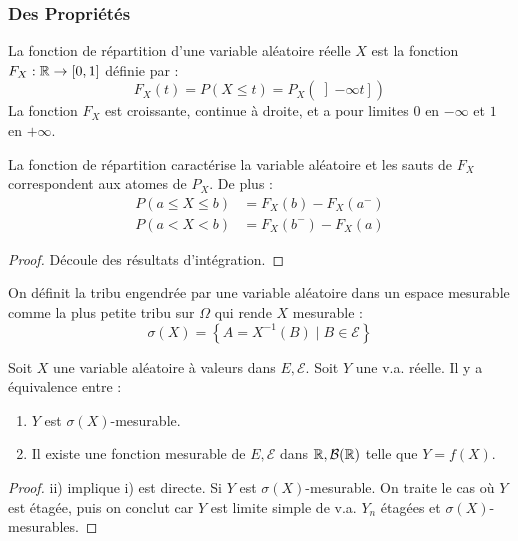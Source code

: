 \documentclass{cours}
\begin{document}
    \subsubsection{Des Propriétés}
    \begin{definition}
        La fonction de répartition d'une variable aléatoire réelle $X$ est la fonction $F_{X} : \mathbb{R} \rightarrow \left[0, 1\right]$ définie par : 
        \[
            F_{X}(t) = P(X \leq t) = P_{X}\left(\left]- \infty t\right]\right)
        \]
        La fonction $F_{X}$ est croissante, continue à droite, et a pour limites $0$ en $-\infty$ et $1$ en $+\infty$.
    \end{definition}

    \begin{proposition}
        La fonction de répartition caractérise la variable aléatoire et les sauts de $F_{X}$ correspondent aux atomes de $P_{X}$. De plus : 
        \[
            \begin{aligned}
                P\left(a \leq X \leq b\right) &= F_{X}(b) - F_{X}(a^{-})\\
                P\left(a < X < b\right) &= F_{X}(b^{-}) - F_{X}(a)
            \end{aligned}    
        \]
    \end{proposition}
    \begin{proof}
        Découle des résultats d'intégration.
    \end{proof}

    \begin{definition}
        On définit la tribu engendrée par une variable aléatoire dans un espace mesurable comme la plus petite tribu sur $\Omega$ qui rende $X$ mesurable : 
        \[
            \sigma(X) = \left\{A = X^{-1}(B)\mid B\in \mathcal{E}\right\}    
        \]
    \end{definition}

    \begin{proposition}
        Soit $X$ une variable aléatoire à valeurs dans $E, \mathcal{E}$. Soit $Y$ une v.a. réelle. Il y a équivalence entre :
        \begin{enumerate}
            \item $Y$ est $\sigma(X)$-mesurable. 
            \item Il existe une fonction mesurable de $E, \mathcal{E}$ dans $\mathbb{R}, \mathcal{B}(\mathbb{R})$ telle que $Y = f(X)$.
        \end{enumerate}
    \end{proposition}
    \begin{proof}
        ii) implique i) est directe. Si $Y$ est $\sigma(X)$-mesurable. On traite le cas où $Y$ est étagée, puis on conclut car $Y$ est limite simple de v.a. $Y_{n}$ étagées et $\sigma(X)$-mesurables.
    \end{proof}
\end{document}
